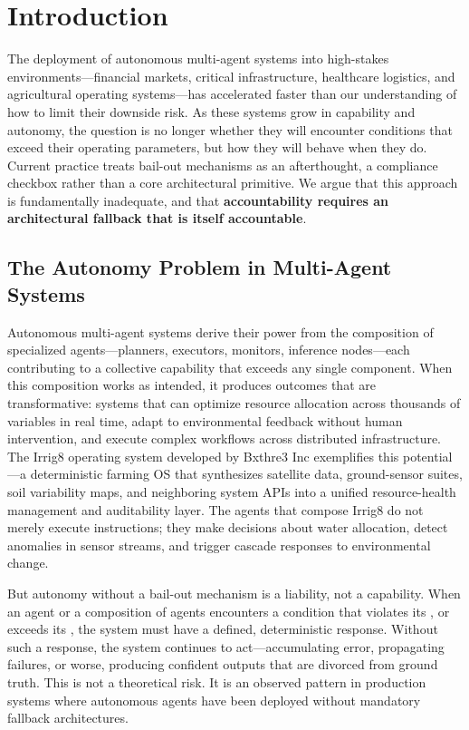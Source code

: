 \section{Introduction}

The deployment of autonomous multi-agent systems into high-stakes environments—financial markets, critical infrastructure, healthcare logistics, and agricultural operating systems—has accelerated faster than our understanding of how to limit their downside risk. As these systems grow in capability and autonomy, the question is no longer whether they will encounter conditions that exceed their operating parameters, but how they will behave when they do. Current practice treats bail-out mechanisms as an afterthought, a compliance checkbox rather than a core architectural primitive. We argue that this approach is fundamentally inadequate, and that \textbf{accountability requires an architectural fallback that is itself accountable}.

\subsection{The Autonomy Problem in Multi-Agent Systems}

Autonomous multi-agent systems derive their power from the composition of specialized agents—planners, executors, monitors, inference nodes—each contributing to a collective capability that exceeds any single component. When this composition works as intended, it produces outcomes that are transformative: systems that can optimize resource allocation across thousands of variables in real time, adapt to environmental feedback without human intervention, and execute complex workflows across distributed infrastructure. The Irrig8 operating system developed by Bxthre3 Inc exemplifies this potential—a deterministic farming OS that synthesizes satellite data, ground-sensor suites, soil variability maps, and neighboring system APIs into a unified resource-health management and auditability layer. The agents that compose Irrig8 do not merely execute instructions; they make decisions about water allocation, detect anomalies in sensor streams, and trigger cascade responses to environmental change.

But autonomy without a bail-out mechanism is a liability, not a capability. When an agent or a composition of agents encounters a condition that violates its \purpose, or exceeds its \bounds, the system must have a defined, deterministic response. Without such a response, the system continues to act—accumulating error, propagating failures, or worse, producing confident outputs that are divorced from ground truth. This is not a theoretical risk. It is an observed pattern in production systems where autonomous agents have been deployed without mandatory fallback architectures.

